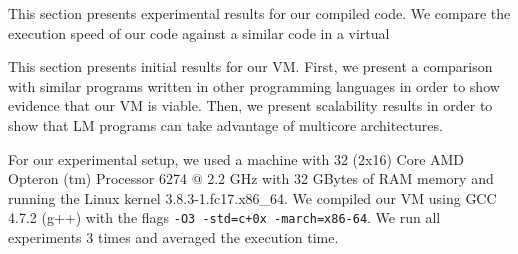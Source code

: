 This section presents experimental results for our compiled code.
We compare the execution speed of our code against a similar code in a virtual

This section presents initial results for our VM. First, we present a
comparison with similar programs written in other programming
languages in order to show evidence that our VM is viable. Then, we
present scalability results in order to show that LM programs can take
advantage of multicore architectures.

For our experimental setup, we used a machine with 32 (2x16) Core AMD
Opteron (tm) Processor 6274 $@$ 2.2 GHz with 32 GBytes of RAM memory
and running the Linux kernel 3.8.3-1.fc17.x86\_64.  We compiled our VM
using GCC 4.7.2 (g++) with the flags \texttt{-O3 -std=c+0x
  -march=x86-64}. We run all experiments 3 times and averaged the
execution time.
